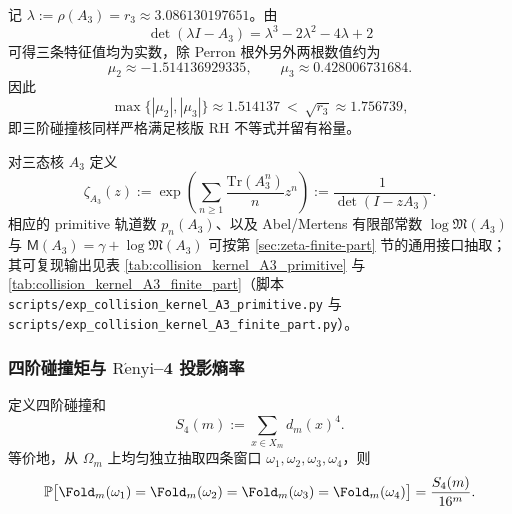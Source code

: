 \begin{remark}\label{rem:pom-collision-rh-margin-a3}
记 \(\lambda:=\rho(A_3)=r_3\approx 3.086130197651\)。由
\[
\det(\lambda I-A_3)=\lambda^3-2\lambda^2-4\lambda+2
\]
可得三条特征值均为实数，除 Perron 根外另外两根数值约为
\[
\mu_2\approx -1.514136929335,\qquad
\mu_3\approx 0.428006731684.
\]
因此
\[
\max\{|\mu_2|,|\mu_3|\}\approx 1.514137\ <\ \sqrt{r_3}\approx 1.756739,
\]
即三阶碰撞核同样严格满足核版 RH 不等式并留有裕量。
\end{remark}

\begin{definition}\label{def:pom-collision-zeta-a3}
对三态核 \(A_3\) 定义
$$
\zeta_{A_3}(z):=\exp\!\left(\sum_{n\ge 1}\frac{\mathrm{Tr}(A_3^n)}{n}z^n\right)
:=\frac{1}{\det(I-zA_3)}.
$$
相应的 primitive 轨道数 \(p_n(A_3)\)、以及 Abel/Mertens 有限部常数 \(\log\mathfrak{M}(A_3)\) 与 \(\mathsf{M}(A_3)=\gamma+\log\mathfrak{M}(A_3)\) 可按第 \ref{sec:zeta-finite-part} 节的通用接口抽取；其可复现输出见表 \ref{tab:collision_kernel_A3_primitive} 与 \ref{tab:collision_kernel_A3_finite_part}（脚本 \texttt{scripts/exp\_collision\_kernel\_A3\_primitive.py} 与 \texttt{scripts/exp\_collision\_kernel\_A3\_finite\_part.py}）。
\end{definition}




\subsubsection{四阶碰撞矩与 \texorpdfstring{$\mathrm{R\acute{e}nyi}$}{Renyi}--4 投影熵率}\label{subsec:pom-s4}
\begin{definition}[四阶折叠碰撞矩]\label{def:pom-s4}
定义四阶碰撞和
$$
S_4(m):=\sum_{x\in X_m} d_m(x)^4.
$$
等价地，从 \(\Omega_m\) 上均匀独立抽取四条窗口 \(\omega_1,\omega_2,\omega_3,\omega_4\)，则
$$
\mathbb{P}\bigl[\Fold_m(\omega_1)=\Fold_m(\omega_2)=\Fold_m(\omega_3)=\Fold_m(\omega_4)\bigr]=\frac{S_4(m)}{16^m}.
$$
\end{definition}

